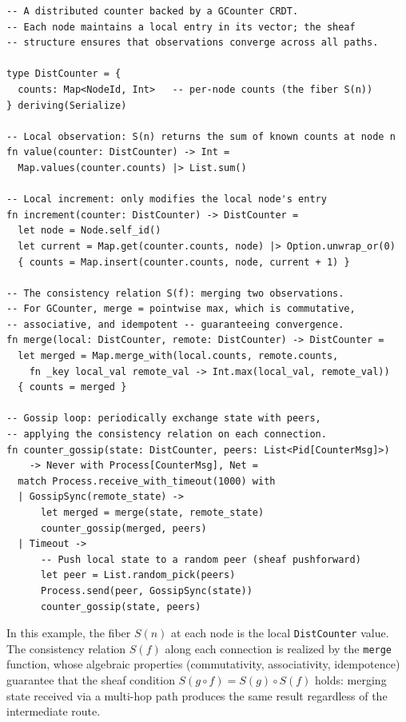\documentclass[11pt,a4paper]{article}
\begin{document}
\begin{lstlisting}
-- A distributed counter backed by a GCounter CRDT.
-- Each node maintains a local entry in its vector; the sheaf
-- structure ensures that observations converge across all paths.

type DistCounter = {
  counts: Map<NodeId, Int>   -- per-node counts (the fiber S(n))
} deriving(Serialize)

-- Local observation: S(n) returns the sum of known counts at node n
fn value(counter: DistCounter) -> Int =
  Map.values(counter.counts) |> List.sum()

-- Local increment: only modifies the local node's entry
fn increment(counter: DistCounter) -> DistCounter =
  let node = Node.self_id()
  let current = Map.get(counter.counts, node) |> Option.unwrap_or(0)
  { counts = Map.insert(counter.counts, node, current + 1) }

-- The consistency relation S(f): merging two observations.
-- For GCounter, merge = pointwise max, which is commutative,
-- associative, and idempotent -- guaranteeing convergence.
fn merge(local: DistCounter, remote: DistCounter) -> DistCounter =
  let merged = Map.merge_with(local.counts, remote.counts,
    fn _key local_val remote_val -> Int.max(local_val, remote_val))
  { counts = merged }

-- Gossip loop: periodically exchange state with peers,
-- applying the consistency relation on each connection.
fn counter_gossip(state: DistCounter, peers: List<Pid[CounterMsg]>)
    -> Never with Process[CounterMsg], Net =
  match Process.receive_with_timeout(1000) with
  | GossipSync(remote_state) ->
      let merged = merge(state, remote_state)
      counter_gossip(merged, peers)
  | Timeout ->
      -- Push local state to a random peer (sheaf pushforward)
      let peer = List.random_pick(peers)
      Process.send(peer, GossipSync(state))
      counter_gossip(state, peers)
\end{lstlisting}

\noindent In this example, the fiber $S(n)$ at each node is the local
\texttt{DistCounter} value. The consistency relation $S(f)$ along each
connection is realized by the \texttt{merge} function, whose algebraic
properties (commutativity, associativity, idempotence) guarantee that the
sheaf condition $S(g \circ f) = S(g) \circ S(f)$ holds: merging state
received via a multi-hop path produces the same result regardless of the
intermediate route.


\end{document}
